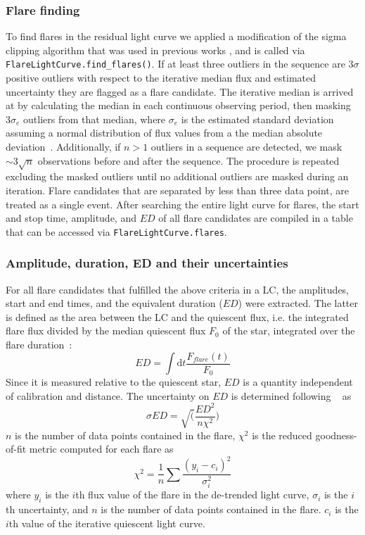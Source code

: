 \documentclass{aastex62}
\begin{document}
\subsubsection{Flare finding}
To find flares in the residual light curve we applied a modification of the sigma clipping algorithm that was used in previous works \citep{chang2015, davenport2016, Ilin2019}, and is called via \texttt{FlareLightCurve.find\_flares()}. If at least three outliers in the sequence are $3\sigma$ positive outliers with respect to the iterative median flux and estimated uncertainty they are flagged as a flare candidate. The iterative median is arrived at by calculating the median in each continuous observing period, then masking $3\sigma_e$ outliers from that median, where $\sigma_e$ is the estimated standard deviation assuming a normal distribution of flux values from a the median absolute deviation~\citep{aigrain_software2016}. Additionally, if $n>1$ outliers in a sequence are detected, we mask $\sim3\sqrt{n}$ observations before and after the sequence. The procedure is repeated excluding the masked outliers until no additional outliers are masked during an iteration. Flare candidates that are separated by less than three data point, are treated as a single event. After searching the entire light curve for flares, the start and stop time, amplitude, and $ED$ of all flare candidates are compiled in a table that can be accessed via \texttt{FlareLightCurve.flares}. 
\subsubsection{Amplitude, duration, ED and their uncertainties}
For all flare candidates that fulfilled the above criteria in a LC, the amplitudes, start and end times, and the equivalent duration ($ED$) were extracted. The latter is defined as the area between the LC and the quiescent flux, i.e. the integrated flare flux divided by the median quiescent flux $F_0$ of the star, integrated over the flare duration~\citep{huntwalker2012}:
\begin{equation}
ED=\displaystyle \int \mathrm dt \frac{F_{flare}(t)}{F_0}
\end{equation}
Since it is measured relative to the quiescent star, $ED$ is a quantity independent of calibration and distance. The uncertainty on $ED$ is determined following ~\citet{davenport2016} as
\begin{equation}
\sigma ED = \sqrt(\frac{ED^2}{n\chi^2})
\end{equation}
$n$ is the number of data points contained in the flare, $\chi^2$ is the reduced goodness-of-fit metric computed for each flare as
\begin{equation}
\chi^2 = \frac{1}{n}\displaystyle\sum \frac{(y_i-c_i)^2}{\sigma_i^2}
\end{equation}
where $y_i$ is the $i$th flux value of the flare in the de-trended light curve, $\sigma_i$ is the $i$th uncertainty, and $n$ is the number of data points contained in the flare. $c_i$ is the $i$th value of the iterative quiescent light curve. 
\end{document}
